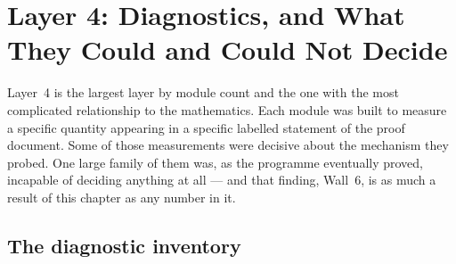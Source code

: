 \chapter{Layer 4: Diagnostics, and What They Could and Could Not Decide}
\label{ch:layer4}

Layer~4 is the largest layer by module count and the one with the most
complicated relationship to the mathematics. Each module was built to measure
a specific quantity appearing in a specific labelled statement of the proof
document. Some of those measurements were decisive about the mechanism they
probed. One large family of them was, as the programme eventually proved, incapable
of deciding anything at all --- and that finding, Wall~6, is as much a result
of this chapter as any number in it.

\section{The diagnostic inventory}
\label{sec:layer4-inventory}

